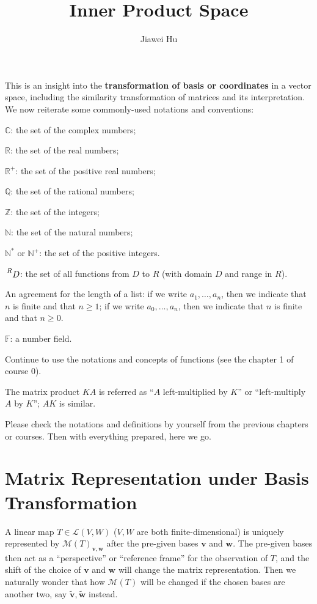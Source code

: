 \documentclass{article}
\title{\LARGE \textbf{Inner Product Space}}
\author{\large Jiawei Hu}
\newcommand{\basisTilde}[1]{\tilde{\pmb{#1}}}
\begin{document}
\maketitle

This is an insight into the \textbf{transformation of basis or coordinates} in a vector space, including the similarity transformation of matrices and its interpretation.
We now reiterate some commonly-used notations and conventions:
\begin{compactenum}
    \item $\mathbb{C}$: the set of the complex numbers;
    \item $\mathbb{R}$: the set of the real numbers;
    \item $\mathbb{R}^+$: the set of the positive real numbers;
    \item $\mathbb{Q}$: the set of the rational numbers;
    \item $\mathbb{Z}$: the set of the integers;
    \item $\mathbb{N}$: the set of the natural numbers;
    \item $\mathbb{N^\ast}$ or $\mathbb{N}^+$: the set of the positive integers.
    \item $\sideset{^R}{}{\mathop{D}}$: the set of all functions from $D$ to $R$ (with domain $D$ and range in $R$).
    \item An agreement for the length of a list: if we write $a_1, \dots, a_n$, then we indicate that $n$ is finite and that $n\geq 1$; if we write $a_0, \dots, a_n$, then we indicate that $n$ is finite and that $n\geq 0$.
    \item $\mathbb{F}$: a number field.
    \item Continue to use the notations and concepts of functions (see the chapter 1 of course 0).
    \item The matrix product $KA$ is referred as ``$A$ left-multiplied by $K$'' or ``left-multiply $A$ by $K$''; $AK$ is similar.
\end{compactenum} 
Please check the notations and definitions by yourself from the previous chapters or courses. Then with everything prepared, here we go.

\section{Matrix Representation under Basis Transformation}
A linear map $T\in\mathcal{L}(V,W)$ ($V, W$ are both finite-dimensional) is uniquely represented by $\mathcal{M}(T)_{\pmb{v}, \pmb{w}}$ after the pre-given bases $\pmb{v}$ and $\pmb{w}$. The pre-given bases then act as a ``perspective'' or ``reference frame'' for the observation of $T$, and the shift of the choice of $\pmb{v}$ and $\pmb{w}$ will change the matrix representation. Then we naturally wonder that how $\mathcal{M}(T)$ will be changed if the chosen bases are another two, say $\basisTilde{v}, \basisTilde{w}$ instead.
\end{document}
